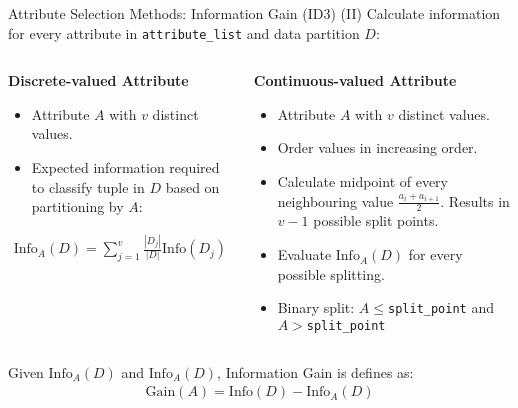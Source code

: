 \begin{frame}{Attribute Selection Methods: Information Gain (ID3) (II)}
	Calculate information for every attribute in \texttt{attribute\_list} and data partition $D$:
	\vspace*{-1.5em}
	\begin{columns}
		\begin{column}{0.5\textwidth}
			\begin{center}
				\textbf{Discrete-valued Attribute}
			\end{center}
			\vspace*{-1em}
			\begin{itemize}
				\item Attribute $A$ with $v$ distinct values.
				\item Expected information required to classify tuple in $D$ based on partitioning by $A$:
			\end{itemize}
			\begin{align*}
				\text{Info}_A(D) = \sum_{j=1}^v \frac{|D_j|}{|D|} \text{Info}(D_j)
			\end{align*}
		\end{column}

		\begin{column}{0.5\textwidth}
			\begin{center}
				\textbf{Continuous-valued Attribute}
			\end{center}
			\vspace*{-1em}

			\begin{itemize}
				\item Attribute $A$ with $v$ distinct values.
				\item Order values in increasing order.
				\item Calculate midpoint of every neighbouring value
				      $\frac{a_i + a_{i+1}}{2}$. Results in $v-1$ possible split points.
				\item Evaluate $\text{Info}_A(D)$ for every possible splitting.
				\item Binary split: $A\leq$\texttt{split\_point} and  $A>$\texttt{split\_point}
			\end{itemize}
		\end{column}
	\end{columns}
	\vspace*{1.5em}
	Given $\text{Info}_A(D)$ and $\text{Info}_A(D)$, Information Gain is defines as:
	\begin{align*}
		\text{Gain}(A) = \text{Info}(D) - \text{Info}_A(D)
	\end{align*}
\end{frame}

